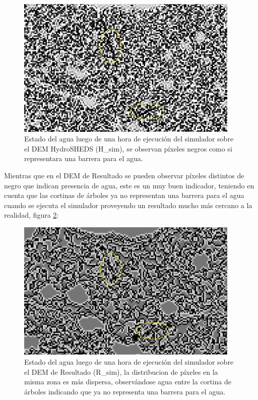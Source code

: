 \documentclass[10pt,a4paper, twoside]{report}
\begin{document}
\begin{figure}[H]
   \centering      
   \includegraphics[width=0.95\textwidth]{imagenes/HydoSHEDSOriginalArbolesEjecucion.jpg}
 \caption{Estado del agua luego de una hora de ejecución del simulador sobre el DEM HydroSHEDS (H\_sim), se observan píxeles negros como si representara una barrera para el agua.}
 \label{HydoSHEDSOriginalArbolesEjecucion}
\end{figure}

Mientras que en el DEM de Resultado se pueden observar píxeles distintos de negro que indican presencia de agua, este es un muy buen indicador, teniendo en cuenta que las cortinas de árboles ya no representan una barrera para el agua cuando se ejecuta el simulador proveyendo un resultado mucho más cercano a la realidad, figura \ref{ResultadoOriginalArbolesEjecucion}:

\begin{figure}[H]
   \centering      
   \includegraphics[width=0.95\textwidth]{imagenes/ResultadoOriginalArbolesEjecucion.jpg}
 \caption{Estado del agua luego de una hora de ejecución del simulador sobre el DEM de Resultado (R\_sim), la distribucion de píxeles en la misma zona es más dispersa, observándose agua entre la cortina de árboles indicando que ya no representa una barrera para el agua.}
 \label{ResultadoOriginalArbolesEjecucion}
\end{figure}
\end{document}
